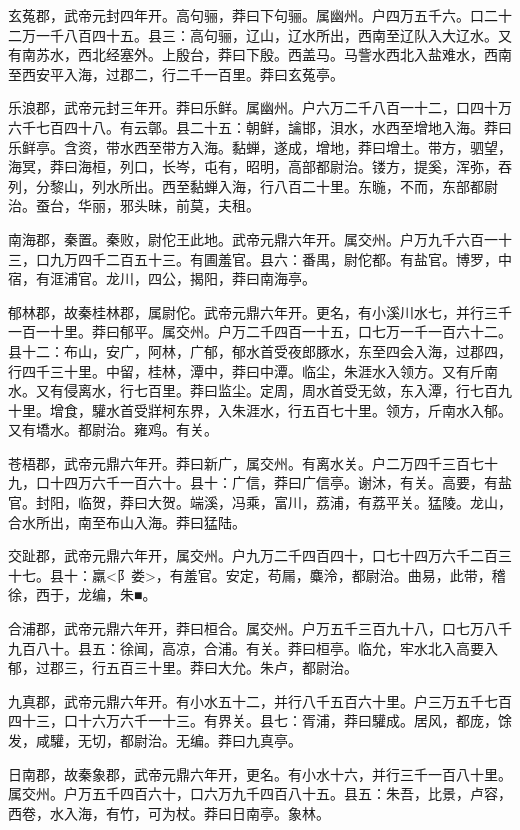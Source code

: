 \documentclass[]{article}
\begin{document}
玄菟郡，武帝元封四年开。高句骊，莽曰下句骊。属幽州。户四万五千六。口二十二万一千八百四十五。县三：高句骊，辽山，辽水所出，西南至辽队入大辽水。又有南苏水，西北经塞外。上殷台，莽曰下殷。西盖马。马訾水西北入盐难水，西南至西安平入海，过郡二，行二千一百里。莽曰玄菟亭。

乐浪郡，武帝元封三年开。莽曰乐鲜。属幽州。户六万二千八百一十二，口四十万六千七百四十八。有云鄣。县二十五：朝鲜，讑邯，浿水，水西至增地入海。莽曰乐鲜亭。含资，带水西至带方入海。黏蝉，遂成，增地，莽曰增土。带方，驷望，海冥，莽曰海桓，列口，长岑，屯有，昭明，高部都尉治。镂方，提奚，浑弥，吞列，分黎山，列水所出。西至黏蝉入海，行八百二十里。东暆，不而，东部都尉治。蚕台，华丽，邪头昧，前莫，夫租。

南海郡，秦置。秦败，尉佗王此地。武帝元鼎六年开。属交州。户万九千六百一十三，口九万四千二百五十三。有圃羞官。县六：番禺，尉佗都。有盐官。博罗，中宿，有洭浦官。龙川，四公，揭阳，莽曰南海亭。

郁林郡，故秦桂林郡，属尉佗。武帝元鼎六年开。更名，有小溪川水七，并行三千一百一十里。莽曰郁平。属交州。户万二千四百一十五，口七万一千一百六十二。县十二：布山，安广，阿林，广郁，郁水首受夜郎豚水，东至四会入海，过郡四，行四千三十里。中留，桂林，潭中，莽曰中潭。临尘，朱涯水入领方。又有斤南水。又有侵离水，行七百里。莽曰监尘。定周，周水首受无敛，东入潭，行七百九十里。增食，驩水首受牂柯东界，入朱涯水，行五百七十里。领方，斤南水入郁。又有墧水。都尉治。雍鸡。有关。

苍梧郡，武帝元鼎六年开。莽曰新广，属交州。有离水关。户二万四千三百七十九，口十四万六千一百六十。县十：广信，莽曰广信亭。谢沐，有关。高要，有盐官。封阳，临贺，莽曰大贺。端溪，冯乘，富川，荔浦，有荔平关。猛陵。龙山，合水所出，南至布山入海。莽曰猛陆。

交趾郡，武帝元鼎六年开，属交州。户九万二千四百四十，口七十四万六千二百三十七。县十：羸\textless{}阝娄\textgreater{}，有羞官。安定，苟屚，麋泠，都尉治。曲易，此带，稽徐，西于，龙编，朱■。

合浦郡，武帝元鼎六年开，莽曰桓合。属交州。户万五千三百九十八，口七万八千九百八十。县五：徐闻，高凉，合浦。有关。莽曰桓亭。临允，牢水北入高要入郁，过郡三，行五百三十里。莽曰大允。朱卢，都尉治。

九真郡，武帝元鼎六年开。有小水五十二，并行八千五百六十里。户三万五千七百四十三，口十六万六千一十三。有界关。县七：胥浦，莽曰驩成。居风，都庞，馀发，咸驩，无切，都尉治。无编。莽曰九真亭。

日南郡，故秦象郡，武帝元鼎六年开，更名。有小水十六，并行三千一百八十里。属交州。户万五千四百六十，口六万九千四百八十五。县五：朱吾，比景，卢容，西卷，水入海，有竹，可为杖。莽曰日南亭。象林。
\end{document}
